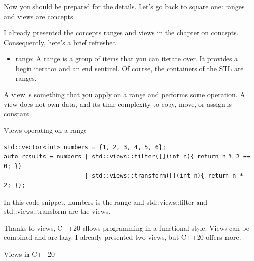 Now you should be prepared for the details. Let’s go back to square one: ranges and views are concepts.


I already presented the concepts ranges and views in the chapter on concepts. Consequently, here’s a brief refresher.

\begin{itemize}
\item 
range: A range is a group of items that you can iterate over. It provides a begin iterator and an end sentinel. Of course, the containers of the STL are ranges.
\end{itemize}

A view is something that you apply on a range and performs some operation. A view does not own data, and its time complexity to copy, move, or assign is constant.

\noindent
Views operating on a range
\begin{lstlisting}[style=styleCXX]
std::vector<int> numbers = {1, 2, 3, 4, 5, 6};
auto results = numbers | std::views::filter([](int n){ return n % 2 == 0; })
                       | std::views::transform([](int n){ return n * 2; });
\end{lstlisting}

In this code snippet, numbers is the range and std::views::filter and std::views::transform are the views.

Thanks to views, C++20 allows programming in a functional style. Views can be combined and are lazy. I already presented two views, but C++20 offers more.


\begin{center}
Views in C++20
\end{center}

